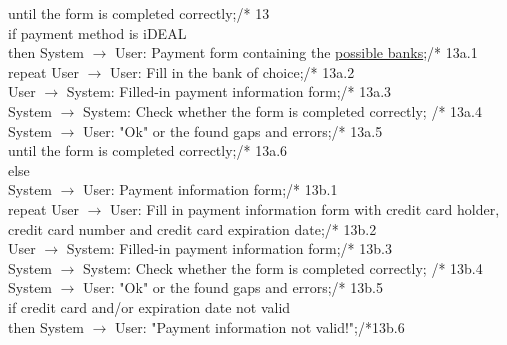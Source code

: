 until the form is completed correctly;\hfill /* 13\\
if payment method is iDEAL\\
then System $\rightarrow$ User: Payment form containing the \underline{possible banks};\hfill /* 13a.1\\
\phantom{x}\hspace{7mm} repeat User $\rightarrow$ User: Fill in the bank of choice;\hfill /* 13a.2\\
\phantom{x}\hspace{14mm} User $\rightarrow$ System: Filled-in payment information form;\hfill /* 13a.3\\
\phantom{x}\hspace{14mm} System $\rightarrow$ System: Check whether the form is completed correctly; \hfill /* 13a.4\\
\phantom{x}\hspace{14mm} System $\rightarrow$ User: "Ok" or the found gaps and errors;\hfill /* 13a.5\\
\phantom{x}\hspace{7mm} until the form is completed correctly;\hfill /* 13a.6\\
else\\
\phantom{x}\hspace{7mm} System $\rightarrow$ User: Payment information form;\hfill /* 13b.1\\
\phantom{x}\hspace{7mm} repeat User $\rightarrow$ User: Fill in payment information form with credit card holder, credit card number and credit card expiration date;\hfill /* 13b.2\\
\phantom{x}\hspace{14mm} User $\rightarrow$ System: Filled-in payment information form;\hfill /* 13b.3\\
\phantom{x}\hspace{14mm} System $\rightarrow$ System: Check whether the form is completed correctly; \hfill /* 13b.4\\
\phantom{x}\hspace{14mm} System $\rightarrow$ User: "Ok" or the found gaps and errors;\hfill /* 13b.5\\
\phantom{x}\hspace{14mm} if credit card and/or expiration date not valid\\
\phantom{x}\hspace{21mm} then System $\rightarrow$ User: "Payment information not valid!";\hfill /*13b.6\\
